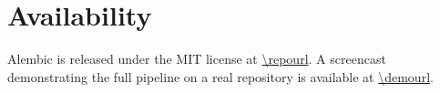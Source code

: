 \section{Availability}
\label{sec:availability}

Alembic is released under the MIT license at \url{\repourl}. A screencast demonstrating the full pipeline on a real repository is available at \url{\demourl}. %

